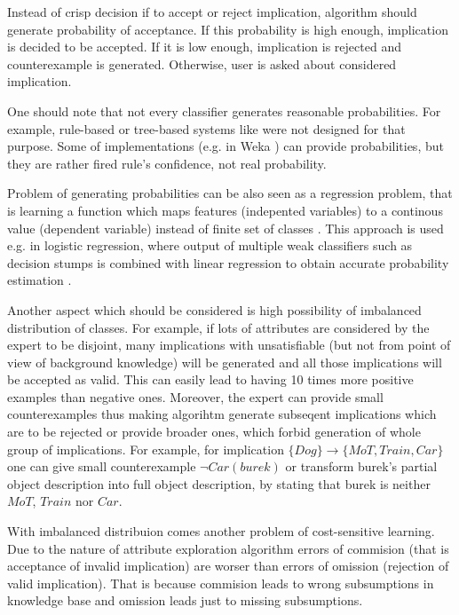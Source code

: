 \documentclass{llncs}
\begin{document}
Instead of crisp decision if to accept or reject implication, algorithm should
generate probability of acceptance. If this probability is high enough,
implication is decided to be accepted. If it is low enough, implication is
rejected and counterexample is generated. Otherwise, user is asked about
considered implication. 

One should note that not every classifier generates
reasonable probabilities. For example, rule-based or tree-based systems like
\cite{Cohen1995} were not designed for that purpose. Some of implementations
(e.g. in Weka \cite{weka}) can provide probabilities, but they are
rather fired rule's confidence, not real probability.

Problem of generating probabilities can be also seen as a regression problem,
that is learning a function which maps features (indepented variables) to a
continous value (dependent variable) instead of finite set of classes
\cite{regression}. This approach is used e.g. in logistic regression, where
output of multiple weak classifiers such as decision stumps
\cite{decision-stumps} is combined with linear regression to obtain accurate
probability estimation \cite{Friedman1998,friedman2000special}.


Another aspect which should be considered is high possibility of imbalanced 
distribution of classes. For example, if lots of attributes are considered by
the expert to be disjoint, many implications with unsatisfiable (but not from
point of view of background knowledge) will be generated and all those
implications will be accepted as valid. This can easily lead to having 10 times
more positive examples than negative ones. Moreover, the expert can provide
small counterexamples thus making algorihtm generate subseqent
implications which are to be rejected or provide broader ones, which forbid
generation of whole group of implications. For example, for implication
$\{Dog\}\to\{MoT,Train,Car\}$ one can give small counterexample $\lnot
Car(burek)$ or transform burek's partial object description into full object
description, by stating that burek is neither $MoT$, $Train$ nor $Car$.

With imbalanced distribuion comes another problem of cost-sensitive learning.
Due to the nature of attribute exploration algorithm errors of commision (that
is acceptance of
invalid implication) are worser than errors of omission (rejection of valid
implication). That is because commision leads to wrong subsumptions in
knowledge base and omission leads just to missing subsumptions. 
\end{document}
